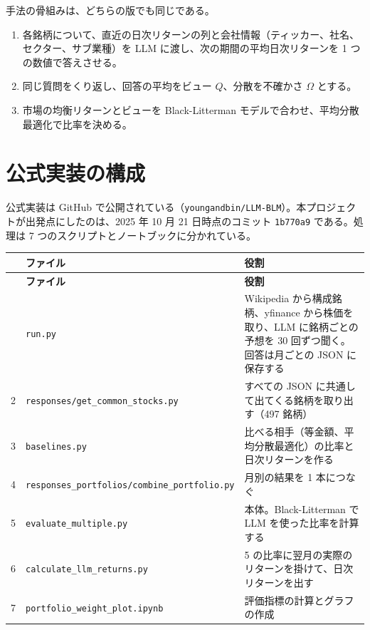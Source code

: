 \documentclass[xelatex,ja=standard,jafont=hiragino-pron,a4paper,10pt]{bxjsreport}
\newcommand{\code}[1]{\texttt{#1}}
\begin{document}
手法の骨組みは、どちらの版でも同じである。

\begin{enumerate}
\item 各銘柄について、直近の日次リターンの列と会社情報（ティッカー、社名、セクター、サブ業種）を LLM に渡し、次の期間の平均日次リターンを 1 つの数値で答えさせる。
\item 同じ質問をくり返し、回答の平均をビュー $Q$、分散を不確かさ $\Omega$ とする。
\item 市場の均衡リターンとビューを Black-Litterman モデルで合わせ、平均分散最適化で比率を決める。
\end{enumerate}

\section{公式実装の構成}

公式実装は GitHub で公開されている（\code{youngandbin/LLM-BLM}）。本プロジェクトが出発点にしたのは、2025 年 10 月 21 日時点のコミット \code{1b770a9} である。処理は 7 つのスクリプトとノートブックに分かれている。

\begin{longtable}{p{0.50cm}p{5.00cm}p{9.00cm}}
\toprule
 & \textbf{ファイル} & \textbf{役割} \\
\midrule
\endfirsthead
\toprule
 & \textbf{ファイル} & \textbf{役割} \\
\midrule
\endhead
\bottomrule
\endfoot
1 & \code{run.py} & Wikipedia から構成銘柄、yfinance から株価を取り、LLM に銘柄ごとの予想を 30 回ずつ聞く。回答は月ごとの JSON に保存する \\
2 & \code{responses/}\allowbreak\code{get\_common\_stocks.py} & すべての JSON に共通して出てくる銘柄を取り出す（497 銘柄） \\
3 & \code{baselines.py} & 比べる相手（等金額、平均分散最適化）の比率と日次リターンを作る \\
4 & \code{responses\_portfolios/}\allowbreak\code{combine\_portfolio.py} & 月別の結果を 1 本につなぐ \\
5 & \code{evaluate\_multiple.py} & 本体。Black-Litterman で LLM を使った比率を計算する \\
6 & \code{calculate\_llm\_returns.py} & 5 の比率に翌月の実際のリターンを掛けて、日次リターンを出す \\
7 & \code{portfolio\_weight\_plot.ipynb} & 評価指標の計算とグラフの作成 \\
\end{longtable}
\end{document}
